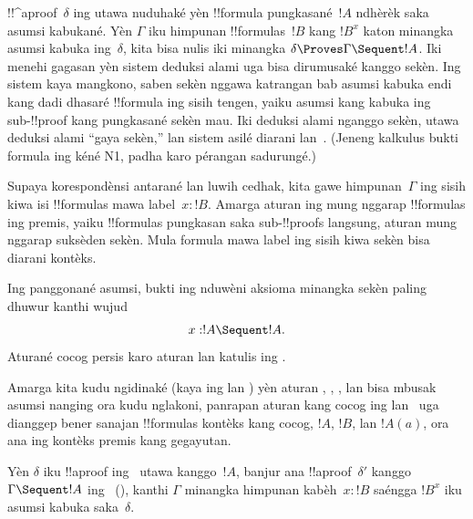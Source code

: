 \documentclass[../../../include/open-logic-section]{subfiles}
\begin{document}


!!^a{proof}~$\delta$ ing  utawa  nuduhaké yèn
!!{formula} pungkasané~$!A$ ndhèrèk saka asumsi kabukané. Yèn
$\Gamma$ iku himpunan !!{formula}s~$!B$ kang $!B^x$ katon minangka
asumsi kabuka ing~$\delta$, kita bisa nulis iki minangka
$\delta \Proves \Gamma \Sequent !A$. Iki menehi gagasan yèn
sistem deduksi alami uga bisa dirumusaké kanggo sekèn. Ing sistem
kaya mangkono, saben sekèn nggawa katrangan bab asumsi kabuka endi
kang dadi dhasaré !!{formula} ing sisih tengen, yaiku asumsi kang
kabuka ing sub-!!{proof} kang pungkasané sekèn mau. Iki deduksi
alami nganggo sekèn, utawa deduksi alami ``gaya sekèn,'' lan
sistem asilé diarani  lan~.
(Jeneng kalkulus bukti formula ing kéné N1, padha karo pérangan sadurungé.)

Supaya korespondènsi antarané  lan  luwih cedhak,
kita gawe himpunan~$\Gamma$ ing sisih kiwa isi !!{formula}s
mawa label~$x:!B$. Amarga aturan ing  mung nggarap
!!{formula}s ing premis, yaiku !!{formula}s pungkasan saka
sub-!!{proof}s langsung, aturan  mung nggarap
suksèden sekèn. Mula formula mawa label ing sisih kiwa
sekèn bisa diarani kontèks.

Ing panggonané asumsi, bukti ing  nduwèni
aksioma minangka sekèn paling dhuwur kanthi wujud
\[x:!A \Sequent !A.\]
Aturané cocog persis karo aturan  lan katulis ing
.



Amarga kita kudu ngidinaké (kaya ing  lan )
yèn aturan \Intro{\lif}, \Intro{\lnot}, \Elim{\lor}, lan \Elim{\lexists}
bisa mbusak asumsi nanging ora kudu nglakoni, panrapan aturan kang
cocog ing  lan~ uga dianggep bener sanajan
!!{formula}s kontèks kang cocog, $!A$, $!B$, lan $!A(a)$,
ora ana ing kontèks premis kang gegayutan.

\begin{prop}
Yèn $\delta$ iku !!a{proof} ing~ utawa 
kanggo~$!A$, banjur ana !!a{proof}~$\delta'$ kanggo
$\Gamma \Sequent !A$ ing~ (), kanthi $\Gamma$
minangka himpunan kabèh~$x:!B$ saéngga $!B^x$ iku asumsi kabuka
saka~$\delta$.
\end{prop}
\end{document}
